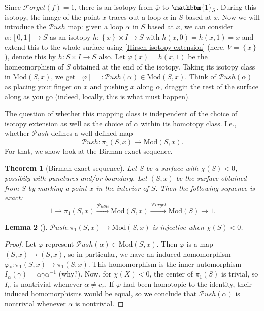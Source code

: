 \documentclass[reqno]{amsart}
\newtheorem{theorem}{Theorem}[section]
\newtheorem{lemma}[theorem]{Lemma}
\theoremstyle{definition}
\theoremstyle{remark}
\newcommand{\Mod}{{\mathrm{Mod}}}
\newcommand{\Push}{{\mathcal{P}}ush}
\newcommand{\Forget}{{\mathcal{F}}orget}
\begin{document}
 Since $\Forget (f) = 1$, there is an isotopy
 from $\overline{\varphi }$ to $\mathbbm{1}_S$. During
 this isotopy, the image of the point $x$ traces out a
 loop $\alpha$ in $S$ based at $x$. Now
 we will introduce the $\Push$ map:
 given a loop $\alpha$ in $S$ based at $x$, we can
 consider $\alpha \colon \left[ 0,1 \right] \to S$ as
 an isotopy $h \colon \left\{ x \right\} \times I
 \to S$ with $h(x,0) = h(x,1) = x$ and extend this
 to the whole surface using \ref{Hirsch-isotopy-extension} (here,
 $V = \left\{ x \right\} $ ), denote this by
 $h \colon S \times I \to S$ also. Let
 $\varphi (x) = h(x,1) $ be the homeomorphism
 of $S$ obtained at the end of the isotopy. Taking its
 isotopy class in $\Mod \left( S,x \right) $, we get
 $\left[ \varphi  \right] = : 
 \Push(\alpha) \in \Mod\left( S,x \right) $.
 Think of $\Push(\alpha)$ as placing your finger on
 $x$ and pushing $x$ along $\alpha$, draggin the
 rest of the surface along as you go (indeed, locally,
 this is what must happen).

 The question of whether this mapping class
 is independent of the choice of isotopy extension
 as well as the choice of $\alpha$ within its homotopy class.
 I.e., whether $\Push$ defines a 
 well-defined map
 \[
 \Push \colon \pi_1 \left( S,x \right) 
 \to \Mod \left( S,x \right) .
 \] 
 For that, we show look at the
 Birman exact sequence.






 \begin{theorem}[Birman exact sequence]
     Let $S$ be a surface with $\chi (S) < 0$, possibily
     with punctures and/or boundary. Let
     $\left( S, x \right) $ be the surface
     obtained from $S$ by marking a point $x$ in
     the interior of $S$. Then the following
     sequence is exact:
     \[
         1 \to \pi_1 \left( S, x \right) \stackrel{\Push}{\to }
         \Mod \left( S, x \right) 
         \stackrel{\Forget}{\to } \Mod(S) \to 1.
     \] 
 \end{theorem}


 \begin{lemma}[]
     $\Push \colon \pi_1 \left( S,x \right) 
     \to \Mod (S,x)$ is injective when
     $\chi (S) <0$.
 \end{lemma}

 \begin{proof}
     Let $\varphi $ represent 
     $\Push \left( \alpha \right) \in 
     \Mod \left( S,x \right) $. Then
     $\varphi $ is a map
     $\left( S,x \right) \to \left( S,x \right) $, so
     in particular, we have an induced homomorphism
     $\varphi_* \colon \pi_1 \left( S,x \right) 
     \to \pi_1 \left( S,x \right) $.
     This homomorphism is the inner automorphism
     $I_{\alpha} (\gamma) = \alpha \gamma \alpha^{-1}$ (why?).
     Now, for $\chi (X) < 0$, the center of $\pi_1 (S)$ is
     trivial, so $I_{\alpha}$ is nontrivial whenever
     $\alpha \neq c_{x}$. If $\varphi $ had been
     homotopic to the identity, their
     induced homomorphisms would be equal, so we conclude
     that $\Push \left( \alpha \right) $ is nontrivial whenever
     $\alpha$ is nontrivial.
 \end{proof}
\end{document}

